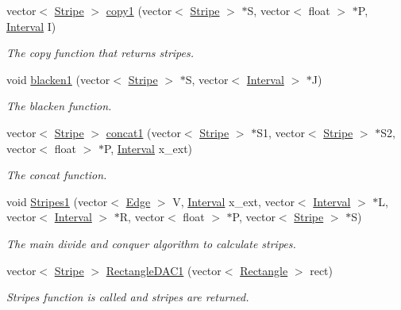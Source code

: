 \begin{DoxyCompactItemize}
vector$<$ \hyperlink{classStripe}{Stripe} $>$ \hyperlink{classisorect_aa9e8b006294ee85a378fbc061f1c4f2f}{copy1} (vector$<$ \hyperlink{classStripe}{Stripe} $>$ $\ast$S, vector$<$ float $>$ $\ast$P, \hyperlink{classInterval}{Interval} I)
\begin{DoxyCompactList}\small\item\em The copy function that returns stripes. \end{DoxyCompactList}\item 
void \hyperlink{classisorect_a689175a85dd1c937a2049498db80a88f}{blacken1} (vector$<$ \hyperlink{classStripe}{Stripe} $>$ $\ast$S, vector$<$ \hyperlink{classInterval}{Interval} $>$ $\ast$J)
\begin{DoxyCompactList}\small\item\em The blacken function. \end{DoxyCompactList}\item 
vector$<$ \hyperlink{classStripe}{Stripe} $>$ \hyperlink{classisorect_aae8881a204dd1aac8bcfa00d95a7a7f0}{concat1} (vector$<$ \hyperlink{classStripe}{Stripe} $>$ $\ast$S1, vector$<$ \hyperlink{classStripe}{Stripe} $>$ $\ast$S2, vector$<$ float $>$ $\ast$P, \hyperlink{classInterval}{Interval} x\+\_\+ext)
\begin{DoxyCompactList}\small\item\em The concat function. \end{DoxyCompactList}\item 
void \hyperlink{classisorect_a74025c4207a4fe68b7a3e8be79d8c1cc}{Stripes1} (vector$<$ \hyperlink{classEdge}{Edge} $>$ V, \hyperlink{classInterval}{Interval} x\+\_\+ext, vector$<$ \hyperlink{classInterval}{Interval} $>$ $\ast$L, vector$<$ \hyperlink{classInterval}{Interval} $>$ $\ast$R, vector$<$ float $>$ $\ast$P, vector$<$ \hyperlink{classStripe}{Stripe} $>$ $\ast$S)
\begin{DoxyCompactList}\small\item\em The main divide and conquer algorithm to calculate stripes. \end{DoxyCompactList}\item 
vector$<$ \hyperlink{classStripe}{Stripe} $>$ \hyperlink{classisorect_af4d857e170d1935ef0e2a9b079bd7e57}{Rectangle\+D\+A\+C1} (vector$<$ \hyperlink{classRectangle}{Rectangle} $>$ rect)
\begin{DoxyCompactList}\small\item\em Stripes function is called and stripes are returned. \end{DoxyCompactList}\end{DoxyCompactItemize}


